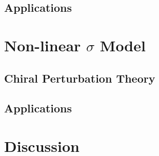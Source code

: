 \documentclass[aps,prd,onecolumn,showpacs,amsmath,amssymb,nofootinbib, 11pt]{revtex4} \pdfoutput=1
\begin{document}
\subsection{Applications}
\section{Non-linear $\sigma$ Model}\label{V}
\subsection{Chiral Perturbation Theory}
\subsection{Applications}

\section{Discussion}\label{VI}

\clearpage
%

\end{document}
